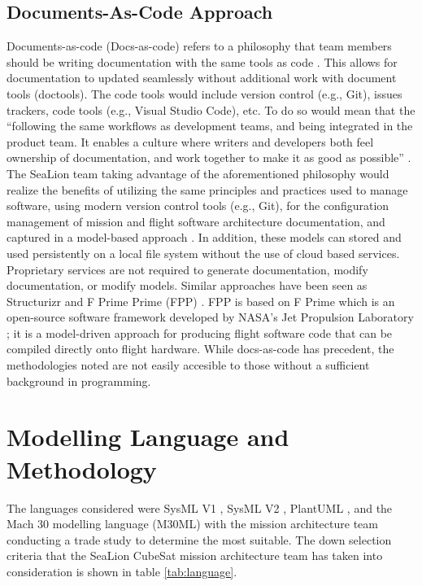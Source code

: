 \documentclass[journal,article,submit,pdftex,moreauthors]{Definitions/mdpi}
\begin{document}
\subsection{Documents-As-Code Approach}
Documents-as-code (Docs-as-code) refers to a philosophy that team members should be writing documentation with the same tools as code \cite{docs_as_code}.  This allows for documentation to updated seamlessly without additional work with document tools (doctools).  The code tools would include version control (e.g., Git), issues trackers, code tools (e.g., Visual Studio Code), etc.  To do so would mean that the “following the same workflows as development teams, and being integrated in the product team. It enables a culture where writers and developers both feel ownership of documentation, and work together to make it as good as possible” \cite{docs_as_code}.  The SeaLion team taking advantage of the aforementioned philosophy would realize the benefits of utilizing the same principles and practices used to manage software, using modern version control tools (e.g., Git), for the configuration management of mission and flight software architecture documentation, and captured in a model-based approach \cite{docs_as_code}.  In addition, these models can stored and used persistently on a local file system without the use of cloud based services.  Proprietary services are not required to generate documentation, modify documentation, or modify models.  Similar approaches have been seen as Structurizr \cite{structurizr} and F Prime Prime (FPP) \cite{f_prime_prime}.  FPP is based on F Prime which is an open-source software framework developed by NASA's Jet Propulsion Laboratory \cite{f_prime}; it is a model-driven approach for producing flight software code that can be compiled directly onto flight hardware.  While docs-as-code has precedent, the methodologies noted are not easily accesible to those without a sufficient background in programming.

\section{Modelling Language and Methodology}
The languages considered were SysML V1 \cite{sys_ml}, SysML V2 \cite{sys_ml2}, PlantUML \cite{plantuml}, and the Mach 30 modelling language (M30ML) \cite{mach30_git} with the mission architecture team conducting a trade study to determine the most suitable.  The down selection criteria that the SeaLion CubeSat mission architecture team has taken into consideration is shown in table \ref{tab:language}.
\end{document}
